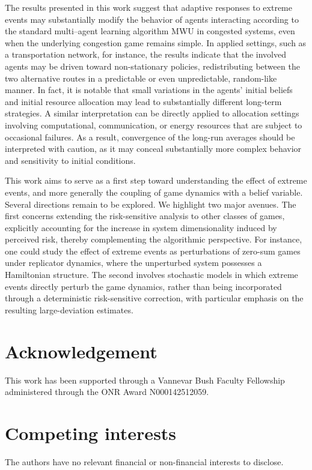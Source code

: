 \documentclass{article}
\theoremstyle{plain}
\theoremstyle{definition}
\begin{document}
The results presented in this work suggest that adaptive responses to extreme events may substantially modify the behavior of agents interacting according to the standard multi--agent learning algorithm MWU in congested systems, even when the underlying congestion game remains simple. In applied settings, such as a transportation network, for instance, the results indicate that the involved agents may be driven toward non-stationary policies, redistributing between the two alternative routes in a predictable or even unpredictable, random-like manner. In fact, it is notable that small variations in the agents' initial beliefs and initial resource allocation may lead to substantially different long-term strategies. A similar interpretation can be directly applied to allocation settings involving computational, communication, or energy resources that are subject to occasional failures. As a result, convergence of the long-run averages should be interpreted with caution, as it may conceal substantially more complex behavior and sensitivity to initial conditions.

This work aims to serve as a first step toward understanding the effect of extreme events, and more generally the coupling of game dynamics with a belief variable. Several directions remain to be explored. We highlight two major avenues. The first concerns extending the risk-sensitive analysis to other classes of games, explicitly accounting for the increase in system dimensionality induced by perceived risk, thereby complementing the algorithmic perspective. For instance, one could study the effect of extreme events as perturbations of zero-sum games under replicator dynamics, where the unperturbed system possesses a Hamiltonian structure. The second involves stochastic models in which extreme events directly perturb the game dynamics, rather than being incorporated through a deterministic risk-sensitive correction, with particular emphasis on the resulting large-deviation estimates.



\section*{Acknowledgement} This work has been supported through a Vannevar Bush Faculty Fellowship administered through the ONR Award N000142512059.

\section*{Competing interests}
The authors have no relevant financial or non-financial interests to disclose.
\end{document}

